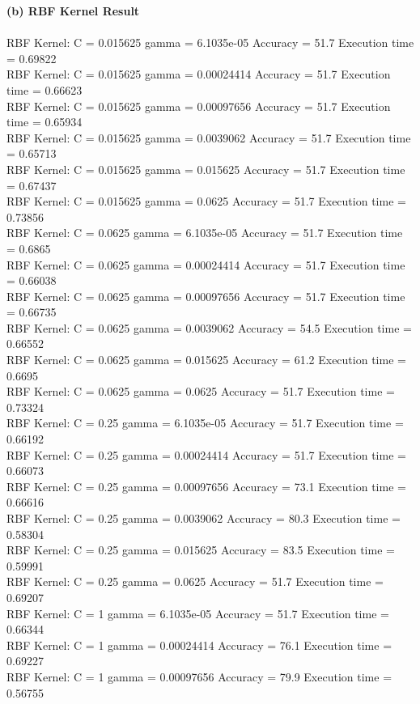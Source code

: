 \documentclass[paper=a4, fontsize=11pt]{scrartcl} %
\numberwithin{equation}{section} %
\numberwithin{figure}{section} %
\numberwithin{table}{section} %
\begin{document}
\textbf{(b) RBF Kernel Result}\\\\
RBF Kernel: C = 0.015625 gamma = 6.1035e-05 Accuracy = 51.7 Execution time = 0.69822\\
RBF Kernel: C = 0.015625 gamma = 0.00024414 Accuracy = 51.7 Execution time = 0.66623\\
RBF Kernel: C = 0.015625 gamma = 0.00097656 Accuracy = 51.7 Execution time = 0.65934\\
RBF Kernel: C = 0.015625 gamma = 0.0039062 Accuracy = 51.7 Execution time = 0.65713\\
RBF Kernel: C = 0.015625 gamma = 0.015625 Accuracy = 51.7 Execution time = 0.67437\\
RBF Kernel: C = 0.015625 gamma = 0.0625 Accuracy = 51.7 Execution time = 0.73856\\
RBF Kernel: C = 0.0625 gamma = 6.1035e-05 Accuracy = 51.7 Execution time = 0.6865\\
RBF Kernel: C = 0.0625 gamma = 0.00024414 Accuracy = 51.7 Execution time = 0.66038\\
RBF Kernel: C = 0.0625 gamma = 0.00097656 Accuracy = 51.7 Execution time = 0.66735\\
RBF Kernel: C = 0.0625 gamma = 0.0039062 Accuracy = 54.5 Execution time = 0.66552\\
RBF Kernel: C = 0.0625 gamma = 0.015625 Accuracy = 61.2 Execution time = 0.6695\\
RBF Kernel: C = 0.0625 gamma = 0.0625 Accuracy = 51.7 Execution time = 0.73324\\
RBF Kernel: C = 0.25 gamma = 6.1035e-05 Accuracy = 51.7 Execution time = 0.66192\\
RBF Kernel: C = 0.25 gamma = 0.00024414 Accuracy = 51.7 Execution time = 0.66073\\
RBF Kernel: C = 0.25 gamma = 0.00097656 Accuracy = 73.1 Execution time = 0.66616\\
RBF Kernel: C = 0.25 gamma = 0.0039062 Accuracy = 80.3 Execution time = 0.58304\\
RBF Kernel: C = 0.25 gamma = 0.015625 Accuracy = 83.5 Execution time = 0.59991\\
RBF Kernel: C = 0.25 gamma = 0.0625 Accuracy = 51.7 Execution time = 0.69207\\
RBF Kernel: C = 1 gamma = 6.1035e-05 Accuracy = 51.7 Execution time = 0.66344\\
RBF Kernel: C = 1 gamma = 0.00024414 Accuracy = 76.1 Execution time = 0.69227\\
RBF Kernel: C = 1 gamma = 0.00097656 Accuracy = 79.9 Execution time = 0.56755\\
\end{document}
